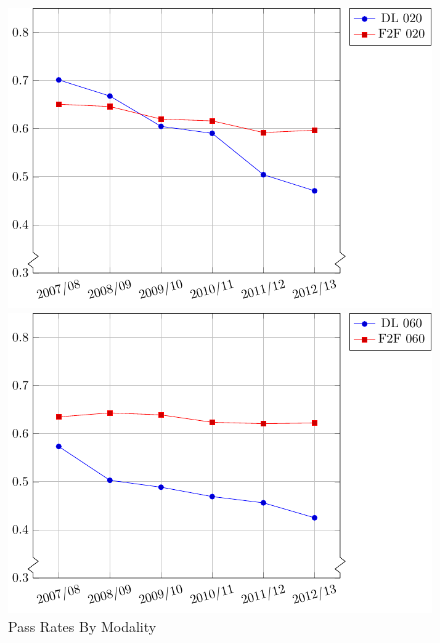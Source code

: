\begin{figure}[!htb]
    \caption{Pass Rates By Modality}\label{fig:sec3:F2FandDLpassRates}
    \begin{minipage}{.3\textwidth}
          \includegraphics[width=\textwidth]{graphics/passRatesByModality020.pdf}
    \end{minipage}
    \begin{minipage}{.3\textwidth}
          \includegraphics[width=\textwidth]{graphics/passRatesByModality060.pdf}
    \end{minipage}
    \begin{minipage}{.3\textwidth}

\end{minipage}
\end{figure}
